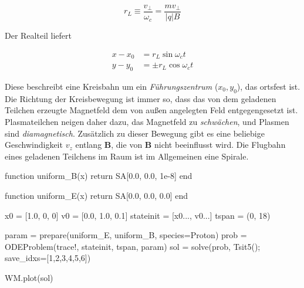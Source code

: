 \documentclass[
  a4paper,
  DIV=11]{scrreprt}
\newenvironment{Shaded}{\begin{snugshade}}{\end{snugshade}}
\newcommand{\ControlFlowTok}[1]{\textcolor[rgb]{0.00,0.23,0.31}{#1}}
\newcommand{\FloatTok}[1]{\textcolor[rgb]{0.68,0.00,0.00}{#1}}
\newcommand{\FunctionTok}[1]{\textcolor[rgb]{0.28,0.35,0.67}{#1}}
\newcommand{\KeywordTok}[1]{\textcolor[rgb]{0.00,0.23,0.31}{#1}}
\newcommand{\NormalTok}[1]{\textcolor[rgb]{0.00,0.23,0.31}{#1}}
\newcommand{\OperatorTok}[1]{\textcolor[rgb]{0.37,0.37,0.37}{#1}}
\begin{document}
\[
r_L \equiv \frac{v_\perp}{\omega_c} = \frac{mv_\perp}{|q| B}
\]

Der Realteil liefert

\[
\begin{aligned}
x - x_0 &= r_L\sin\omega_c t \\
y - y_0 &= \pm r_L \cos\omega_c t  
\end{aligned} 
\]

Diese beschreibt eine Kreisbahn um ein \emph{Führungszentrum}
(\(x_0, y_0\)), das ortsfest ist. Die Richtung der Kreisbewegung ist
immer so, dass das von dem geladenen Teilchen erzeugte Magnetfeld dem
von außen angelegten Feld entgegengesetzt ist. Plasmateilchen neigen
daher dazu, das Magnetfeld zu \emph{schwächen}, und Plasmen sind
\emph{diamagnetisch}. Zusätzlich zu dieser Bewegung gibt es eine
beliebige Geschwindigkeit \(v_z\) entlang \(\mathbf{B}\), die von
\(\mathbf{B}\) nicht beeinflusst wird. Die Flugbahn eines geladenen
Teilchens im Raum ist im Allgemeinen eine Spirale.

\begin{Shaded}
\begin{Highlighting}[]
\KeywordTok{function} \FunctionTok{uniform\_B}\NormalTok{(x)}
    \ControlFlowTok{return}\NormalTok{ SA[}\FloatTok{0.0}\NormalTok{, }\FloatTok{0.0}\NormalTok{, }\FloatTok{1e{-}8}\NormalTok{]}
\KeywordTok{end}

\KeywordTok{function} \FunctionTok{uniform\_E}\NormalTok{(x)}
    \ControlFlowTok{return}\NormalTok{ SA[}\FloatTok{0.0}\NormalTok{, }\FloatTok{0.0}\NormalTok{, }\FloatTok{0.0}\NormalTok{]}
\KeywordTok{end}

\NormalTok{x0 }\OperatorTok{=}\NormalTok{ [}\FloatTok{1.0}\NormalTok{, }\FloatTok{0}\NormalTok{, }\FloatTok{0}\NormalTok{]}
\NormalTok{v0 }\OperatorTok{=}\NormalTok{ [}\FloatTok{0.0}\NormalTok{, }\FloatTok{1.0}\NormalTok{, }\FloatTok{0.1}\NormalTok{]}
\NormalTok{stateinit }\OperatorTok{=}\NormalTok{ [x0}\OperatorTok{...}\NormalTok{, v0}\OperatorTok{...}\NormalTok{]}
\NormalTok{tspan }\OperatorTok{=}\NormalTok{ (}\FloatTok{0}\NormalTok{, }\FloatTok{18}\NormalTok{)}

\NormalTok{param }\OperatorTok{=} \FunctionTok{prepare}\NormalTok{(uniform\_E, uniform\_B, species}\OperatorTok{=}\NormalTok{Proton)}
\NormalTok{prob }\OperatorTok{=} \FunctionTok{ODEProblem}\NormalTok{(trace!, stateinit, tspan, param)}
\NormalTok{sol }\OperatorTok{=} \FunctionTok{solve}\NormalTok{(prob, }\FunctionTok{Tsit5}\NormalTok{(); save\_idxs}\OperatorTok{=}\NormalTok{[}\FloatTok{1}\NormalTok{,}\FloatTok{2}\NormalTok{,}\FloatTok{3}\NormalTok{,}\FloatTok{4}\NormalTok{,}\FloatTok{5}\NormalTok{,}\FloatTok{6}\NormalTok{])}

\NormalTok{WM.}\FunctionTok{plot}\NormalTok{(sol)}
\end{Highlighting}
\end{Shaded}
\end{document}
